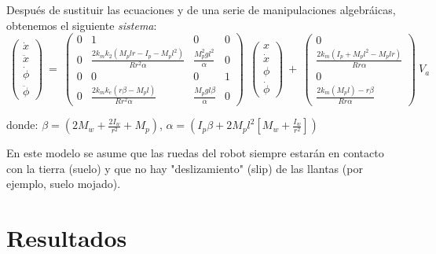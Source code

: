 \documentclass[10pt]{article}
\begin{document}
\vspace{2 mm}
Después de sustituir las ecuaciones y de una serie de manipulaciones algebráicas, obtenemos el siguiente \emph{sistema}:
\vspace{2 mm}
\begin{equation}
\  \left( \begin{array}{c}
\dot{x} \\
\ddot{x}\\
\dot{\phi} \\
\ddot{\phi} \end{array} \right) \   =
\  \left( \begin{array}{cccc}
0 & 1 & 0 & 0\\
0 & \frac{2k_{m}k_{2}(M_{p}lr - I_{p} - M_{p}l^2)}{Rr^2\alpha} & \frac{M_{p}^2gl^2}{\alpha} & 0\\
0 & 0 & 0 & 1 \\
0 & \frac{2k_{m}k_{e}(r\beta - M_{p}l)}{Rr^2\alpha} & \frac{M_{p}gl\beta}{\alpha} & 0 \end{array} \right) \ 
\  \left( \begin{array}{c}
x \\
\dot{x}\\
\phi \\
\dot{\phi}\end{array} \right) \ 
+
\  \left( \begin{array}{c}
0 \\
\frac{2k_{m}(I_{p} + M_{p}l^2 - M_{p}lr)}{Rr\alpha}\\
0\\
\frac{2k_{m}(M_{p}l) - r\beta}{Rr\alpha} \end{array} \right) \ V_{a}
\end{equation}

\vspace{2 mm}
donde:
$\beta = (2M_{w} + \frac{2I_{w}}{r^2} + M_{p})$,   
\hspace{4 mm}
$\alpha = (I_{p}\beta + 2M_{p}l^2[M_{w} + \frac{I_{w}}{r^2}])$

\vspace{2 mm}
En este modelo se asume que las ruedas del robot siempre estarán en contacto con la tierra (suelo) y que no hay "deslizamiento" (slip) de las llantas (por ejemplo, suelo mojado).
\section{Resultados}

\begin{center}
\end{center}
\begin{center}
\end{center}
\begin{center}
\end{center}
\begin{center}
\end{center}
\end{document}
